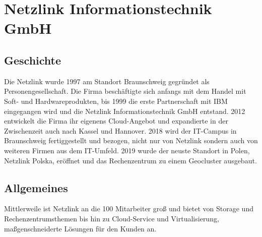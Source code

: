 \chapter{Netzlink Informationstechnik GmbH}
\label{app:netzlink}

\section{Geschichte} 
Die Netzlink wurde 1997 am Standort Braunschweig gegründet als Personengesellschaft. 
Die Firma beschäftigte sich anfangs mit dem Handel mit Soft- und Hardwareprodukten, bis 1999 die erste Partnerschaft mit IBM eingegangen wird und die Netzlink Informationstechnik GmbH entstand.
2012 entwickelt die Firma ihr eigenens Cloud-Angebot  und expandierte in der Zwischenzeit auch nach Kassel und Hannover. 
2018 wird der IT-Campus in Braunschweig fertiggestellt und bezogen, nicht nur von Netzlink sondern auch von weiteren Firmen aus dem IT-Umfeld. 
2019 wurde der neuste Standort in Polen, Netzlink Polska, eröffnet und das Rechenzentrum zu einem Geocluster ausgebaut. 
\cite{Netzlink_history}

\section{Allgemeines}
Mittlerweile ist Netzlink an die 100 Mitarbeiter groß und bietet von Storage und Rechenzentrumsthemen bis hin zu Cloud-Service und Virtualisierung, maßgenschneiderte Lösungen für den Kunden an.
\cite{Netzlink_history}